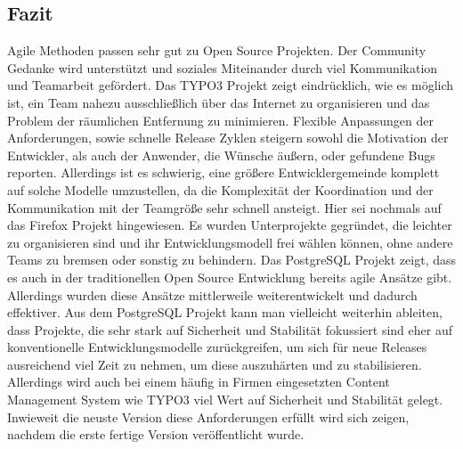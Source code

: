   \subsection{Fazit}
  Agile Methoden passen sehr gut zu Open Source Projekten. Der Community Gedanke wird unterstützt und soziales Miteinander durch viel Kommunikation und Teamarbeit gefördert. Das TYPO3 Projekt zeigt eindrücklich, wie es möglich ist, ein Team nahezu ausschließlich über das Internet zu organisieren und das Problem der räumlichen Entfernung zu minimieren. Flexible Anpassungen der Anforderungen, sowie schnelle Release Zyklen steigern sowohl die Motivation der Entwickler, als auch der Anwender, die Wünsche äußern, oder gefundene Bugs reporten. Allerdings ist es schwierig, eine größere Entwicklergemeinde komplett auf solche Modelle umzustellen, da die Komplexität der Koordination und der Kommunikation mit der Teamgröße sehr schnell ansteigt. Hier sei nochmals auf das Firefox Projekt hingewiesen. Es wurden Unterprojekte gegründet, die leichter zu organisieren sind und ihr Entwicklungsmodell frei wählen können, ohne andere Teams zu bremsen oder sonstig zu behindern. Das PostgreSQL Projekt zeigt, dass es auch in der traditionellen Open Source Entwicklung bereits agile Ansätze gibt. Allerdings wurden diese Ansätze mittlerweile weiterentwickelt und dadurch effektiver. Aus dem PostgreSQL Projekt kann man vielleicht weiterhin ableiten, dass Projekte, die sehr stark auf Sicherheit und Stabilität fokussiert sind eher auf konventionelle Entwicklungsmodelle zurückgreifen, um sich für neue Releases ausreichend viel Zeit zu nehmen, um diese auszuhärten und zu stabilisieren. Allerdings wird auch bei einem häufig in Firmen eingesetzten Content Management System wie TYPO3 viel Wert auf Sicherheit und Stabilität gelegt. Inwieweit die neuste Version diese Anforderungen erfüllt wird sich zeigen, nachdem die erste fertige Version veröffentlicht wurde.


